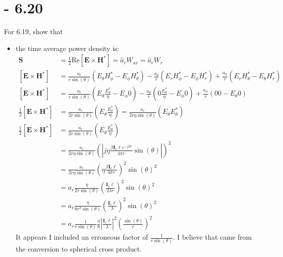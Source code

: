 \documentclass[12pt]{article}
\begin{document}
\section{- 6.20}
For 6.19, show that
\begin{itemize}
\item the time average power density is:
  \begin{align*}
    \mathbf{S} &= \frac{1}{2}\text{Re}{[\mathbf{E}\times\mathbf{H}^*]} = \hat a_r W_{av} = \hat a_r W_{r}\\
    [\mathbf{E}\times\mathbf{H}^*] &= \frac{a_r}{r\sin{\left(\theta\right)}}\left(E_{\theta}H^*_{\phi}-E_{\phi}H^*_{\theta}\right) - \frac{a_\theta}{r}\left(E_{r}H^*_{\phi}-E_{\phi}H^*_{r}\right) + \frac{a_\phi}{r}\left(E_{r}H^*_{\theta}-E_{\theta}H^*_{r}\right)\\
    [\mathbf{E}\times\mathbf{H}^*] &= \frac{a_r}{r\sin{\left(\theta\right)}}\left(E_{\theta}\frac{E^*_{\theta}}{\eta}-E_{\phi}0\right) - \frac{a_\theta}{r}\left(0\frac{E^*_{\theta}}{\eta}-E_{\phi}0\right) + \frac{a_\phi}{r}\left(00-E_{\theta}0\right)\\
    \frac{1}{2}[\mathbf{E}\times\mathbf{H}^*] &= \frac{a_r}{2r\sin{\left(\theta\right)}}\left(E_{\theta}\frac{E^*_{\theta}}{\eta}\right) = \frac{a_r}{2r\eta\sin{\left(\theta\right)}}\left(E_{\theta}E^*_{\theta}\right)\\
    \frac{1}{2}[\mathbf{E}\times\mathbf{H}^*] &= \frac{a_r}{2r\sin{\left(\theta\right)}}\left(E_{\theta}\frac{E^*_{\theta}}{\eta}\right) \\
    &= \frac{a_r}{2r\eta\sin{\left(\theta\right)}}\left(\left|j\eta \frac{\beta \bm{I}_e\ell e^{-j\beta r}}{4 \pi r} \sin{(\theta)}\right|\right)^2\\
    &= \frac{a_r}{2r\eta\sin{\left(\theta\right)}}\left(\eta \frac{\beta \bm{I}_e\ell}{4 \pi r}\right)^2 \sin{(\theta)}^2\\
    &= a_r\frac{\eta}{2r\sin{\left(\theta\right)}}\left( \frac{ \bm{I}_e\ell}{2 \lambda r}\right)^2 \sin{(\theta)}^2\\
    &= a_r\frac{\eta}{8r^3\sin{\left(\theta\right)}}\left( \frac{ \bm{I}_e\ell}{\lambda}\right)^2 \sin{(\theta)}^2\\
    &= a_r\frac{1}{r\sin{\left(\theta\right)}}\frac{\eta}{8}\left| \frac{ \bm{I}_e\ell}{\lambda}\right|^2 \left(\frac{\sin{(\theta)}}{r}\right)^2
  \end{align*}
  It appears I included an erroneous factor of $\frac{1}{r\sin{\left(\theta\right)}}$. I believe that came from the conversion to spherical cross product. 

\end{itemize}
\end{document}
